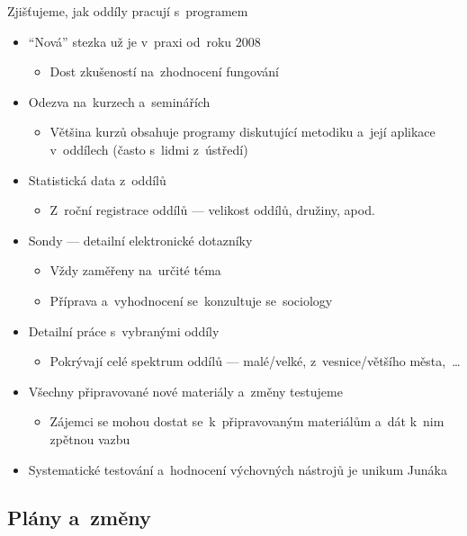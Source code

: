 \documentclass[compress, ucs, xelatex, 11pt, xcolor=dvipsnames, print, aspectratio=169,
	hyperref={
		bookmarks=true,
		unicode=true,
		colorlinks=true,
		pdftitle={Skautska vychovna metoda},
		plainpages=false,
		pdfauthor={Vojtech Zeisek},
		pdfsubject={Skautska vychovna metoda a jeji vyvoj za posledni stoleti a desetileti},
		pdfcreator={XeLaTeX},
		pdfkeywords={Junak, Pedagogika, Skaut, Skauting, Vychovna metoda},
		linkcolor=Red, %
		anchorcolor=ForestGreen, %
		citecolor=ForestGreen, %
		filecolor=ForestGreen, %
		menucolor=ForestGreen, %
		urlcolor=Sepia, %
		pdftex},
	url={hyphens, lowtilde} %
	]{beamer}
\begin{document}
\begin{frame}{Zjišťujeme, jak oddíly pracují s~programem}
	\begin{itemize}
		\item \enquote{Nová} stezka už je v~praxi od~roku 2008
		\begin{itemize}
			\item Dost zkušeností na~zhodnocení fungování
		\end{itemize}
		\item Odezva na~kurzech a~seminářích
		\begin{itemize}
			\item Většina kurzů obsahuje programy diskutující metodiku a~její aplikace v~oddílech (často s~lidmi z~ústředí)
		\end{itemize}
		\item Statistická data z~oddílů
		\begin{itemize}
			\item Z~roční registrace oddílů --- velikost oddílů, družiny, apod.
		\end{itemize}
		\item Sondy --- detailní elektronické dotazníky
		\begin{itemize}
			\item Vždy zaměřeny na~určité téma
			\item Příprava a~vyhodnocení se~konzultuje se~sociology
		\end{itemize}
		\item Detailní práce s~vybranými oddíly
		\begin{itemize}
			\item Pokrývají celé spektrum oddílů --- malé/velké, z~vesnice/většího města,~\ldots
		\end{itemize}
		\item Všechny připravované nové materiály a~změny testujeme
		\begin{itemize}
			\item Zájemci se mohou dostat se~k~připravovaným materiálům a~dát k~nim zpětnou vazbu
		\end{itemize}
		\item \alert{Systematické testování a~hodnocení výchovných nástrojů je unikum Junáka}
	\end{itemize}
\end{frame}

\subsection{Plány a~změny}
\end{document}
